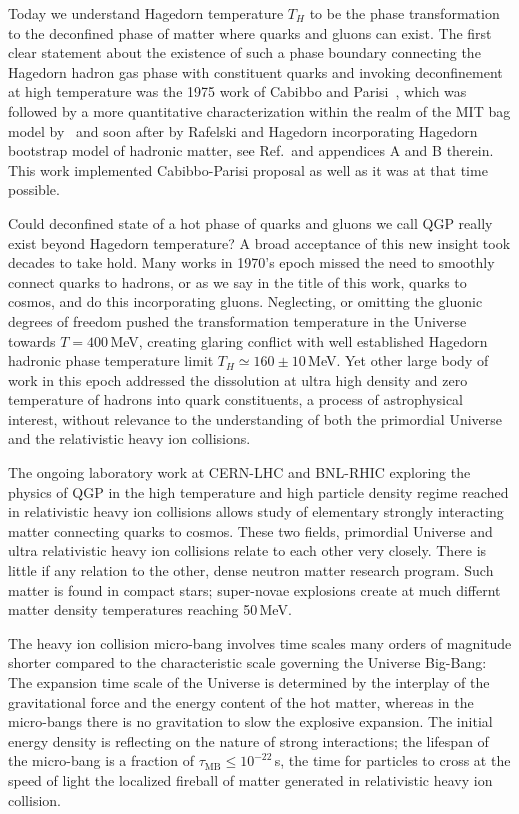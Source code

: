 Today we understand Hagedorn temperature $T_H$ to be the phase transformation to the deconfined phase of matter where quarks and gluons can exist. The first clear statement about the existence of such a phase boundary connecting the Hagedorn hadron gas phase with constituent quarks and invoking deconfinement at high temperature was the 1975 work of Cabibbo and Parisi~\cite{Cabibbo:1975ig}, which was followed by a more quantitative characterization within the realm of the MIT bag model by~\cite{Chin:1978gj} and soon after by Rafelski and Hagedorn incorporating Hagedorn bootstrap model of hadronic matter, see Ref.\,\cite{Rafelski:2015cxa} and appendices A and B therein. This work implemented Cabibbo-Parisi proposal as well as it was at that time possible.

Could deconfined state of a hot phase of quarks and gluons we call QGP really exist beyond Hagedorn temperature? A broad acceptance of this new insight took decades to take hold. Many works in 1970's epoch missed the need to smoothly connect quarks to hadrons, or as we say in the title of this work, quarks to cosmos, and do this incorporating gluons. Neglecting, or omitting the gluonic degrees of freedom pushed the transformation temperature in the Universe towards $T=400$\,MeV, creating glaring conflict with well established Hagedorn hadronic phase temperature limit $T_H\simeq 160\pm 10$\,MeV. Yet other large body of work in this epoch addressed the dissolution at ultra high density and zero temperature of hadrons into quark constituents, a process of astrophysical interest, without relevance to the understanding of both the primordial Universe and the relativistic heavy ion collisions.

The ongoing laboratory work at CERN-LHC and BNL-RHIC exploring the physics of QGP in the high temperature and high particle density regime reached in relativistic heavy ion collisions allows study of elementary strongly interacting matter connecting quarks to cosmos. These two fields, primordial Universe and ultra relativistic heavy ion collisions relate to each other very closely. There is little if any relation to the other, dense neutron matter research program. Such matter is found in compact stars; super-novae explosions create at much differnt matter density temperatures reaching 50\,MeV. 

The heavy ion collision micro-bang involves time scales many orders of magnitude shorter compared to the characteristic scale governing the Universe Big-Bang: The expansion time scale of the Universe is determined by the interplay of the gravitational force and the energy content of the hot matter, whereas in the micro-bangs there is no gravitation to slow the explosive expansion. The initial energy density is reflecting on the nature of strong interactions; the lifespan of the micro-bang is a fraction of $\tau_\mathrm{MB}\le 10^{-22}$\,s, the time for particles to cross at the speed of light the localized fireball of matter generated in relativistic heavy ion collision. 

